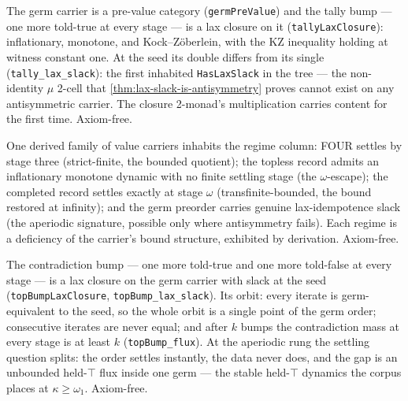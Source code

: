 \begin{theorem}\label{thm:germ-lax-slack}\leanok{}
The germ carrier is a pre-value category (\texttt{germPreValue}) and the
tally bump --- one more told-true at every stage --- is a lax closure on it
(\texttt{tallyLaxClosure}): inflationary, monotone, and Kock--Zöberlein,
with the KZ inequality holding at witness constant one. At the seed its
double differs from its single (\texttt{tally\_lax\_slack}): the first
inhabited \texttt{HasLaxSlack} in the tree --- the non-identity
$\mu$ 2-cell that \ref{thm:lax-slack-is-antisymmetry} proves cannot exist on
any antisymmetric carrier. The closure 2-monad's multiplication carries
content for the first time. Axiom-free.
\end{theorem}

\begin{theorem}\label{thm:regime-tower}\leanok{}
One derived family of value carriers inhabits the regime column: FOUR
settles by stage three (strict-finite, the bounded quotient); the topless
record admits an inflationary monotone dynamic with no finite settling
stage (the $\omega$-escape); the completed record settles exactly at stage
$\omega$ (transfinite-bounded, the bound restored at infinity); and the
germ preorder carries genuine lax-idempotence slack (the aperiodic
signature, possible only where antisymmetry fails). Each regime is a
deficiency of the carrier's bound structure, exhibited by derivation.
Axiom-free.
\end{theorem}

\begin{theorem}\label{thm:top-bump-flux}\leanok{}
The contradiction bump --- one more told-true and one more told-false at
every stage --- is a lax closure on the germ carrier with slack at the seed
(\texttt{topBumpLaxClosure}, \texttt{topBump\_lax\_slack}). Its orbit: every
iterate is germ-equivalent to the seed, so the whole orbit is a single
point of the germ order; consecutive iterates are never equal; and after
$k$ bumps the contradiction mass at every stage is at least $k$
(\texttt{topBump\_flux}). At the aperiodic rung the settling question
splits: the order settles instantly, the data never does, and the gap is
an unbounded held-$\top$ flux inside one germ --- the stable held-$\top$
dynamics the corpus places at $\kappa \ge \omega_1$. Axiom-free.
\end{theorem}

